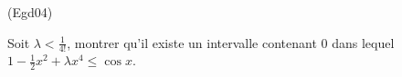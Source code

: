 \begin{tiny}(Egd04)\end{tiny}
Soit $\lambda <\frac{1}{4!}$, montrer qu'il existe un intervalle
contenant $0$ dans lequel $1-\frac{1}{2}x^{2}+\lambda x^{4}\leq
\cos x$.